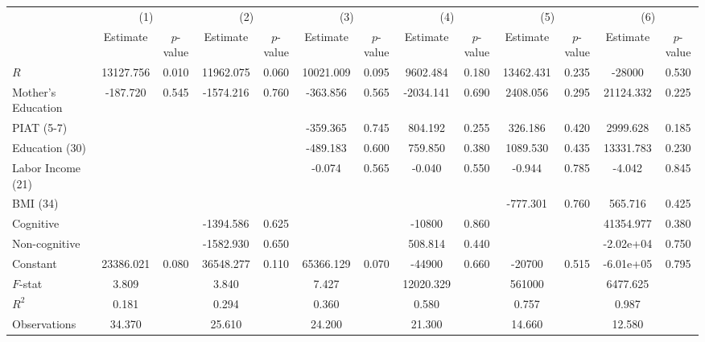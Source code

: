 
\begin{tabular}{lcccccccccccc} \toprule
 & \multicolumn{2}{c}{(1)}  &  \multicolumn{2}{c}{(2)}  &  \multicolumn{2}{c}{(3)}  &  \multicolumn{2}{c}{(4)}  & \multicolumn{2}{c}{(5)} & \multicolumn{2}{c}{(6)} \\  
 & Estimate & $p$-value & Estimate & $p$-value & Estimate & $p$-value & Estimate & $p$-value & Estimate & $p$-value & Estimate & $p$-value \\ \midrule
$R$ & 13127.756 &     0.010 & 11962.075 &     0.060 & 10021.009 &     0.095 &  9602.484 &     0.180 & 13462.431 &     0.235 & -28000 &     0.530 \\  
Mother's Education &  -187.720 &     0.545 & -1574.216 &     0.760 &  -363.856 &     0.565 & -2034.141 &     0.690 &  2408.056 &     0.295 & 21124.332 &     0.225 \\  
PIAT (5-7) &         &         &         &         &  -359.365 &     0.745 &   804.192 &     0.255 &   326.186 &     0.420 &  2999.628 &     0.185 \\  
Education (30) &         &         &         &         &  -489.183 &     0.600 &   759.850 &     0.380 &  1089.530 &     0.435 & 13331.783 &     0.230 \\  
Labor Income (21) &         &         &         &         &    -0.074 &     0.565 &    -0.040 &     0.550 &    -0.944 &     0.785 &    -4.042 &     0.845 \\  
BMI (34) &         &         &         &         &         &         &         &         &  -777.301 &     0.760 &   565.716 &     0.425 \\  
Cognitive &         &         & -1394.586 &     0.625 &         &         & -10800 &     0.860 &         &         & 41354.977 &     0.380 \\  
Non-cognitive &         &         & -1582.930 &     0.650 &         &         &   508.814 &     0.440 &         &         & -2.02e+04 &     0.750 \\  
Constant & 23386.021 &     0.080 & 36548.277 &     0.110 & 65366.129 &     0.070 & -44900 &     0.660 & -20700 &     0.515 & -6.01e+05 &     0.795 \\ \midrule 
$F$-stat &     3.809 &         &     3.840 &         &     7.427 &         & 12020.329 &         &  561000 &         &  6477.625 &         \\  
$R^2$ &     0.181 &         &     0.294 &         &     0.360 &         &     0.580 &         &     0.757 &         &     0.987 &         \\  
Observations &    34.370 &         &    25.610 &         &    24.200 &         &    21.300 &         &    14.660 &         &    12.580 &         \\  
\bottomrule \end{tabular}

